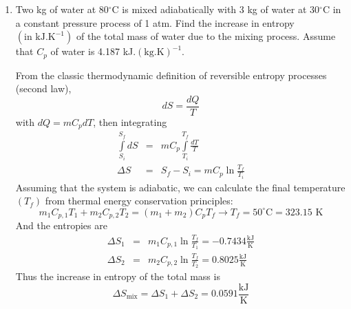 \documentclass[12pts,a4paper,amsmath,amssymb,floatfix]{article}%
\newcommand{\frc}{\displaystyle\frac}
\begin{document}
\begin{enumerate}[1)]
\clearpage
   \item Two kg of water at 80$^{\circ}$C is mixed adiabatically with 3 kg of water at 30$^{\circ}$C in a constant pressure process of 1 atm. Find the increase in entropy $\left(\text{in kJ.K}^{-1}\right)$ of the total mass of water due to the mixing process. Assume that $C_{p}$ of water is 4.187 kJ.$\left(\text{kg.K}\right)^{-1}$. 

        From the classic thermodynamic definition of reversible entropy processes (second law),
         \begin{displaymath}
            d S = \frc{d Q}{T}
         \end{displaymath}
         with $dQ = m C_{p}dT$, then integrating 
         \begin{eqnarray}
            \int\limits_{S_{i}}^{S_{f}} dS &=& m C_{p}\int\limits_{T_{i}}^{T_{f}}\frc{dT}{T} \nonumber \\
            \Delta S &=& S_{f}-S_{i} = m C_{p} \ln{\frc{T_{f}}{T_{i}}} \nonumber
         \end{eqnarray}
         Assuming that the system is adiabatic, we can calculate the final temperature $\left(T_{f}\right)$ from thermal energy conservation principles: 
         \begin{displaymath}
            m_{1}C_{p,1}T_{1} + m_{2}C_{p,2}T_{2} = \left(m_{1}+m_{2}\right)C_{p}T_{f} \rightarrow T_{f} = 50^{\circ}\text{C} = 323.15\text{ K}
         \end{displaymath}
         And the entropies are
         \begin{eqnarray}
             \Delta S_{1} &=& m_{1}C_{p,1}\ln{\frc{T_{f}}{T_{1}}} =  -0.7434\frc{\text{kJ}}{\text{K}} \nonumber \\
             \Delta S_{2} &=& m_{2}C_{p,2}\ln{\frc{T_{f}}{T_{2}}} =  0.8025\frc{\text{kJ}}{\text{K}} \nonumber 
         \end{eqnarray}
         Thus the increase in entropy of the total mass is
         \begin{displaymath}
              \Delta S_{\text{mix}} = \Delta S_{1} + \Delta S_{2} = 0.0591\frc{\text{kJ}}{\text{K}}
         \end{displaymath}


%
\end{enumerate}


\end{document}
